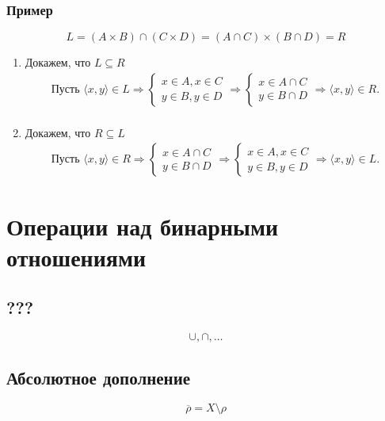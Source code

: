 \documentclass{article}
\begin{document}
\subsubsection{Пример}
\[
    L = (A \times B) \cap (C \times D) = (A \cap C) \times (B \cap D) = R
\]
\begin{enumerate}
    \item Докажем, что $L \subseteq R$
    \begin{gather*}
        \text{Пусть } \langle x, y \rangle \in L \Rightarrow
        \begin{cases}
            x \in A, x \in C \\
            y \in B, y \in D
        \end{cases} \Rightarrow 
        \begin{cases}
            x \in A \cap C \\
            y \in B \cap D
        \end{cases}
        \Rightarrow \langle x, y \rangle \in R. \\
    \end{gather*}
    \item Докажем, что $R \subseteq L$
    \begin{gather*}
        \text{Пусть } \langle x, y \rangle \in R \Rightarrow
        \begin{cases}
            x \in A \cap C \\
            y \in B \cap D
        \end{cases} \Rightarrow 
        \begin{cases}
            x \in A, x \in C \\
            y \in B, y \in D
        \end{cases}
        \Rightarrow \langle x, y \rangle \in L.
    \end{gather*}
\end{enumerate}


\section{Операции над бинарными отношениями}

\subsection{???}
\[
    \cup, \cap, \dots
\]


\subsection{Абсолютное дополнение}
\[
    \overline{\rho} = X \setminus \rho 
\]
\end{document}
